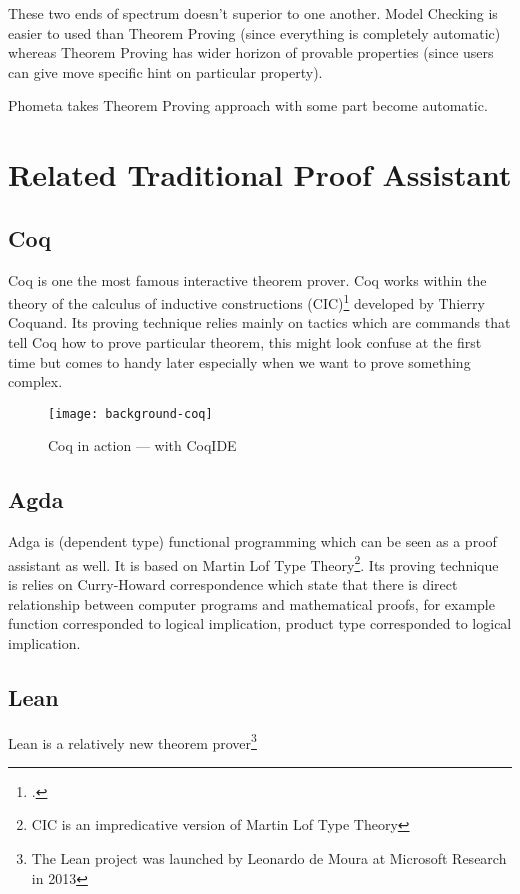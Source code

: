 \documentclass[master.tex]{subfiles}
\begin{document}
These two ends of spectrum doesn't superior to one another. Model Checking is easier to used than Theorem Proving (since everything is completely automatic) whereas Theorem Proving has wider horizon of provable properties (since users can give move specific hint on particular property).

Phometa takes Theorem Proving approach with some part become automatic.

\section{Related Traditional Proof Assistant}

\subsection{Coq}
Coq\supercite{coq-official-website} is one the most famous interactive theorem prover. Coq works within the theory of the calculus of inductive constructions (CIC)\footcite{CIC is itself is developed alongside Coq.} developed by Thierry Coquand\supercite{thierry-coquand-homepage}. Its proving technique relies mainly on tactics which are commands that tell Coq how to prove particular theorem, this might look confuse at the first time but comes to handy later especially when we want to prove something complex.

\begin{figure}[H]
    \centering
    \texttt{[image: background-coq]}
    \caption{Coq in action --- with CoqIDE \supercite{coq-official-website}}
\label{fig:background-coq}
\end{figure}

\subsection{Agda}
Adga\supercite{agda-official-website} is (dependent type) functional programming which can be seen as a proof assistant as well. It is based on Martin Lof Type Theory\footnote{CIC is an impredicative version of Martin Lof Type Theory}. Its proving technique is relies on Curry-Howard correspondence which state that there is direct relationship between computer programs and mathematical proofs\supercite{curry-howard-correspondence}, for example function corresponded to logical implication, product type corresponded to logical implication.

\subsection{Lean}
Lean\supercite{lean-offical-website} is a relatively new theorem prover\footnote{The Lean project was launched by Leonardo de Moura at Microsoft Research in 2013}
\end{document}
